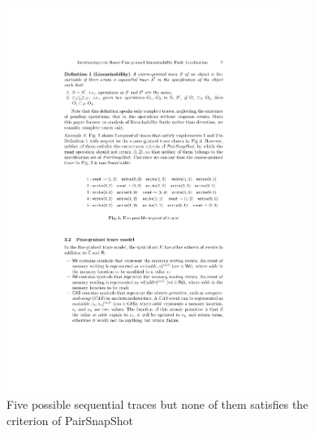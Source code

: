 \documentclass[runningheads]{llncs}
\newcommand{\pair}[1]{{\langle{#1}\rangle}}
\begin{document}
\begin{figure}
\centering
\includegraphics[width = 3.5in]{5seqs.pdf}
	
	
	
	
    \caption{Five possible sequential traces but none of them satisfies the criterion of PairSnapShot}\label{fig:accounttwoseqtraces}
\end{figure}
\end{document}

